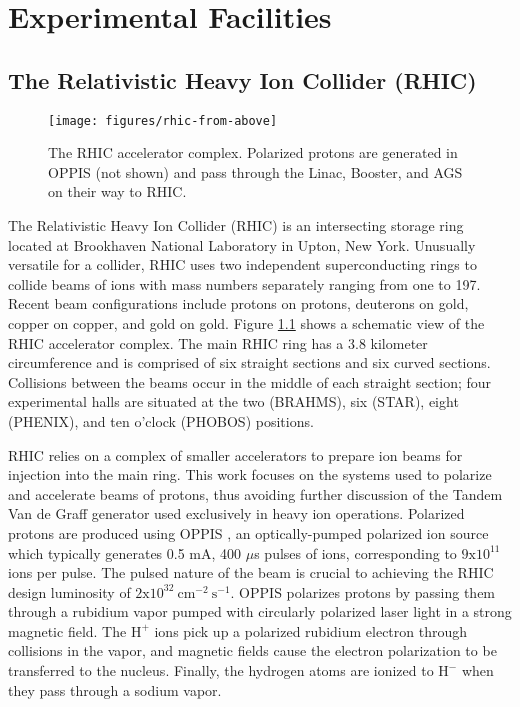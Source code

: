\chapter{Experimental Facilities}

\section{The Relativistic Heavy Ion Collider (RHIC)}

\begin{figure}
  \begin{center}
    \texttt{[image: figures/rhic-from-above]}
  \end{center}
  \caption{The RHIC accelerator complex. Polarized protons are generated in
  OPPIS (not shown) and pass through the Linac, Booster, and AGS on their way
  to RHIC.}
  \label{fig:rhic}
\end{figure}

The Relativistic Heavy Ion Collider (RHIC) is an intersecting storage ring
located at Brookhaven National Laboratory in Upton, New York. Unusually
versatile for a collider, RHIC uses two independent superconducting rings to
collide beams of ions with mass numbers separately ranging from one to 197.
Recent beam configurations include protons on protons, deuterons on gold,
copper on copper, and gold on gold. Figure \ref{fig:rhic} shows a schematic
view of the RHIC accelerator complex. The main RHIC ring has a 3.8 kilometer
circumference and is comprised of six straight sections and six curved
sections. Collisions between the beams occur in the middle of each straight
section; four experimental halls are situated at the two (BRAHMS), six (STAR),
eight (PHENIX), and ten o'clock (PHOBOS) positions.

RHIC relies on a complex of smaller accelerators to prepare ion beams for
injection into the main ring. This work focuses on the systems used to
polarize and accelerate beams of protons, thus avoiding further discussion of
the Tandem Van de Graff generator used exclusively in heavy ion operations.
Polarized protons are produced using OPPIS \cite{Zelenski:2002gb,
Zelenski:2008zza}, an optically-pumped polarized ion source which typically
generates 0.5 mA, 400 $\mu$s pulses of ions, corresponding to
$\mathrm{9x10^{11}}$ ions per pulse. The pulsed nature of the beam is crucial
to achieving the RHIC design luminosity of
$\mathrm{2x10^{32}~cm^{-2}~s^{-1}}$. OPPIS polarizes protons by passing them
through a rubidium vapor pumped with circularly polarized laser light in a
strong magnetic field. The $\mathrm{H^+}$ ions pick up a polarized rubidium
electron through collisions in the vapor, and magnetic fields cause the
electron polarization to be transferred to the nucleus. Finally, the hydrogen
atoms are ionized to $\mathrm{H^-}$ when they pass through a sodium vapor.

